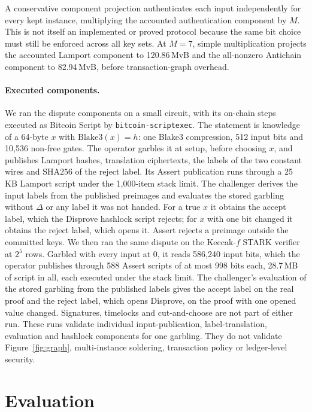\documentclass[11pt]{article}
\newcommand{\blake}{\mathrm{Blake3}}
\begin{document}
A conservative component projection authenticates each input independently for
every kept instance, multiplying the accounted authentication component by $M$. This is
not itself an implemented or proved protocol because the same bit choice must
still be enforced across all key sets. At $M=7$, simple multiplication projects
the accounted Lamport component to 120.86\,MvB and the all-nonzero Antichain
component to 82.94\,MvB,
before transaction-graph overhead.

\paragraph{Executed components.} We ran the dispute components on a small circuit, with its
on-chain steps executed as Bitcoin Script by \texttt{bitcoin-scriptexec}. The
statement is knowledge of a 64-byte $x$ with $\blake(x)=h$: one Blake3
compression, 512 input bits and 10{,}536 non-free gates. The operator garbles it
at setup, before choosing $x$, and publishes Lamport hashes, translation
ciphertexts, the labels of the two constant wires and $\mathrm{SHA256}$ of the
reject label. Its Assert publication runs through a 25\,KB Lamport script under the
1{,}000-item stack limit. The challenger derives the input labels from the
published preimages and evaluates the stored garbling without $\Delta$ or any
label it was not handed. For a true $x$ it obtains the accept label, which the
Disprove hashlock script rejects; for $x$ with one bit changed it obtains the
reject label, which opens it. Assert rejects a preimage outside the committed
keys. We then ran the same dispute on the Keccak-$f$ STARK verifier at $2^5$
rows. Garbled with every input at 0, it reads 586{,}240 input bits, which the
operator publishes through 588 Assert scripts of at most 998 bits each,
28.7\,MB of script in all, each executed under the stack limit. The challenger's
evaluation of the stored garbling from the published labels gives the accept label
on the real proof and the reject label, which opens Disprove, on the proof with
one opened value changed. Signatures, timelocks and cut-and-choose are not part
of either run. These runs validate individual input-publication,
label-translation, evaluation and hashlock components for one garbling. They do
not validate Figure~\ref{fig:graph}, multi-instance soldering, transaction
policy or ledger-level security.

\section{Evaluation}\label{sec:eval}
\end{document}
